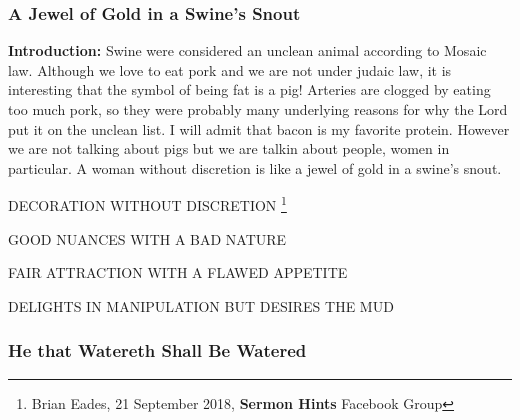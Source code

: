 \subsubsection{A Jewel of Gold in a Swine's Snout}


\textbf{Introduction:} Swine were considered an unclean animal according to Mosaic law. Although we love to eat pork and we are not under judaic law, it is interesting that the symbol of being fat is a pig! Arteries are clogged by eating too much pork, so they were probably many underlying reasons for why the Lord put it on the unclean list. I will admit that bacon is my favorite protein. However we are not talking about pigs but we are talkin about people, women in particular. A woman without discretion is like a jewel of gold in a swine's snout.
\begin{compactenum}[I.]
    \item DECORATION WITHOUT DISCRETION \footnote{Brian Eades, 21 September 2018, \textbf{Sermon Hints} Facebook Group}
    \item GOOD NUANCES WITH A BAD NATURE
    \item FAIR ATTRACTION WITH A FLAWED APPETITE
    \item DELIGHTS IN MANIPULATION BUT DESIRES THE MUD
\end{compactenum}

\subsubsection{He that Watereth Shall Be Watered}


